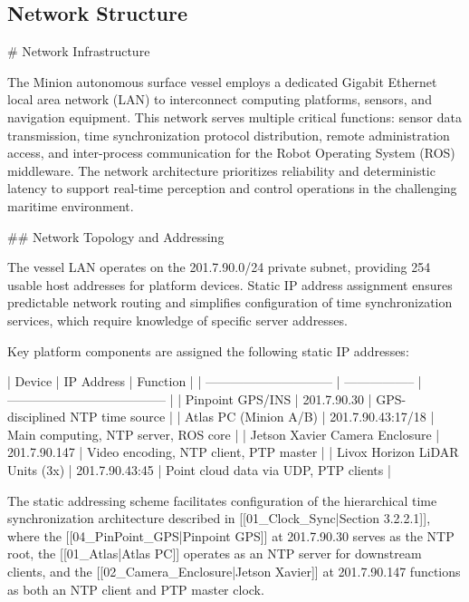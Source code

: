 \documentclass{erauthesis}
\begin{document}
\subsection{Network Structure} \label{comp:network}

# Network Infrastructure

The Minion autonomous surface vessel employs a dedicated Gigabit Ethernet local area network (LAN) to interconnect computing platforms, sensors, and navigation equipment. This network serves multiple critical functions: sensor data transmission, time synchronization protocol distribution, remote administration access, and inter-process communication for the Robot Operating System (ROS) middleware. The network architecture prioritizes reliability and deterministic latency to support real-time perception and control operations in the challenging maritime environment.

## Network Topology and Addressing

The vessel LAN operates on the 201.7.90.0/24 private subnet, providing 254 usable host addresses for platform devices. Static IP address assignment ensures predictable network routing and simplifies configuration of time synchronization services, which require knowledge of specific server addresses. 

Key platform components are assigned the following static IP addresses:

| Device                         | IP Address        | Function                               |
| ------------------------------ | ----------------- | -------------------------------------- |
| Pinpoint GPS/INS               | 201.7.90.30       | GPS-disciplined NTP time source        |
| Atlas PC (Minion A/B)          | 201.7.90.43:17/18 | Main computing, NTP server, ROS core   |
| Jetson Xavier Camera Enclosure | 201.7.90.147      | Video encoding, NTP client, PTP master |
| Livox Horizon LiDAR Units (3x) | 201.7.90.43:45    | Point cloud data via UDP, PTP clients  |

The static addressing scheme facilitates configuration of the hierarchical time synchronization architecture described in [[01_Clock_Sync|Section 3.2.2.1]], where the [[04_PinPoint_GPS|Pinpoint GPS]] at 201.7.90.30 serves as the NTP root, the [[01_Atlas|Atlas PC]] operates as an NTP server for downstream clients, and the [[02_Camera_Enclosure|Jetson Xavier]] at 201.7.90.147 functions as both an NTP client and PTP master clock.
\end{document}
